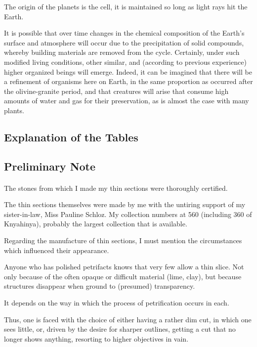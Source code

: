 \documentclass[a4paper, 12pt, oneside]{article}
\begin{document}
The origin of the planets is the cell, it is maintained so long as light rays hit the Earth.

It is possible that over time changes in the chemical composition of the Earth's surface and atmosphere will occur due to the precipitation of solid compounds, whereby building materials are removed from the cycle. Certainly, under such modified living conditions, other similar, and (according to previous experience) higher organized beings will emerge. Indeed, it can be imagined that there will be a refinement of organisms here on Earth, in the same proportion as occurred after the olivine-granite period, and that creatures will arise that consume high amounts of water and gas for their preservation, as is almost the case with many plants.
\clearpage
\subsection{Explanation of the Tables}
\subsection{Preliminary Note}
\paragraph*{}
The stones from which I made my thin sections were thoroughly certified.

The thin sections themselves were made by me with the untiring support of my sister-in-law, Miss Pauline Schloz. My collection numbers at 560 (including 360 of Knyahinya), probably the largest collection that is available.

Regarding the manufacture of thin sections, I must mention the circumstances which influenced their appearance.

Anyone who has polished petrifacts knows that very few allow a thin slice. Not only because of the often opaque or difficult material (lime, clay), but because structures disappear when ground to (presumed) transparency.

It depends on the way in which the process of petrification occurs in each.

Thus, one is faced with the choice of either having a rather dim cut, in which one sees little, or, driven by the desire for sharper outlines, getting a cut that no longer shows anything, resorting to higher objectives in vain.
\end{document}
